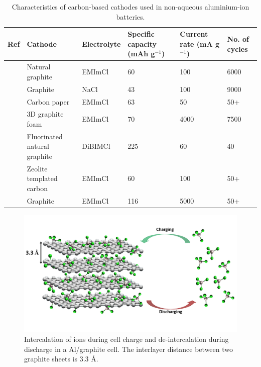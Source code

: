 \begin{table}
\caption{Characteristics of carbon-based cathodes used in non-aqueous aluminium-ion batteries.} \label{tabCref}
\begin{center}
\begin{tabular}{ |p{0.5cm}|p{2cm}|p{2cm}|p{2cm}|p{2cm}|p{1.5cm}|}
\hline
\textbf{Ref} & \textbf{Cathode} & \textbf{Electrolyte} & \textbf{Specific capacity (mAh g$^{-1}$)} & \textbf{Current rate (mA g$^{-1}$)} & \textbf{No. of cycles} \\
\hline
\cite{wang_advanced_2017} & Natural graphite & EMImCl & 60 & 100 & 6000 \\
\cite{song_long-life_2017} & Graphite & NaCl & 43 & 100 & 9000 \\
\cite{sun_new_2015} & Carbon paper & EMImCl & 63 & 50 & 50+ \\
\cite{lin_ultrafast_2015} & 3D graphite foam & EMImCl & 70 & 4000 & 7500 \\
\cite{rani_fluorinated_2013} & Fluorinated natural graphite & DiBIMCl & 225 & 60 & 40 \\
\cite{stadie_zeolite-templated_2017} & Zeolite templated carbon & EMImCl & 60 & 100 & 50+ \\
& Graphite & EMImCl & 116 & 5000 & 50+ \\*

\hline
\end{tabular}
\end{center}
\end{table}

\begin{figure}[h]
\centering
\includegraphics[width=\textwidth]{Figures/chap5fig/graphmech}
\caption{Intercalation of  ions during cell charge and de-intercalation during discharge in a Al/graphite cell. The interlayer distance between two graphite sheets is 3.3 \AA.}
 \label{Figures/chap5fig:graphmech}
\end{figure}

